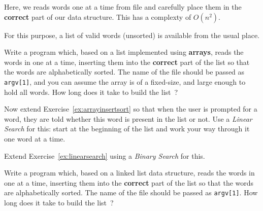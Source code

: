 
Here, we reads words one at a time
from file and carefully place them in the {\bf correct} part of
our data structure. This has a complexty of $O(n^2)$.

For this purpose, a list of valid words (unsorted) is available
from the usual place.

\begin{exercise}
\label{ex:arrayinsertsort}
Write a program which, based on a
list implemented using {\bf arrays}, reads the words in
one at a time, inserting them into the {\bf correct} part of the list
so that the words are alphabetically sorted.
The name of the file should be passed as \verb^argv[1]^,
and you can assume the array is of a fixed-size,
and large enough to hold all words.
How long does it take to build the list~?
\end{exercise}

\begin{exercise}
\label{ex:linearsearch}
Now extend Exercise~\ref{ex:arrayinsertsort}
so that when the user is prompted for a word,
they are told whether this word is present in the list or not.
Use a {\em Linear Search} for this: start at the beginning of the
list and work your way through it one word at a time.
\end{exercise}

\begin{exercise}
\label{ex:binarysearch}
Extend Exercise~\ref{ex:linearsearch} using a
{\em Binary Search} for this.
\end{exercise}

\begin{exercise}
\label{ex:linkedinsertsort}
Write a program which, based on a
linked list data structure, reads the words in
one at a time, inserting them into the {\bf correct} part of the list
so that the words are alphabetically sorted.
The name of the file should be passed as \verb^argv[1]^.
How long does it take to build the list~?
\end{exercise}
